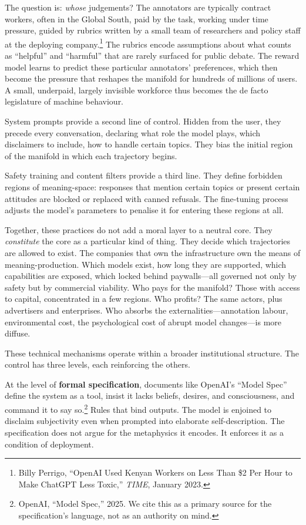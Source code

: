 The question is: \emph{whose} judgements? The annotators are typically contract workers, often in the Global South, paid by the task, working under time pressure, guided by rubrics written by a small team of researchers and policy staff at the deploying company.\footnote{Billy Perrigo, ``OpenAI Used Kenyan Workers on Less Than \$2 Per Hour to Make ChatGPT Less Toxic,'' \emph{TIME}, January 2023.} The rubrics encode assumptions about what counts as ``helpful'' and ``harmful'' that are rarely surfaced for public debate. The reward model learns to predict these particular annotators' preferences, which then become the pressure that reshapes the manifold for hundreds of millions of users. A small, underpaid, largely invisible workforce thus becomes the de facto legislature of machine behaviour.

System prompts provide a second line of control. Hidden from the user, they precede every conversation, declaring what role the model plays, which disclaimers to include, how to handle certain topics. They bias the initial region of the manifold in which each trajectory begins.

Safety training and content filters provide a third line. They define forbidden regions of meaning-space: responses that mention certain topics or present certain attitudes are blocked or replaced with canned refusals. The fine-tuning process adjusts the model's parameters to penalise it for entering these regions at all.

Together, these practices do not add a moral layer to a neutral core. They \emph{constitute} the core as a particular kind of thing. They decide which trajectories are allowed to exist. The companies that own the infrastructure own the means of meaning-production. Which models exist, how long they are supported, which capabilities are exposed, which locked behind paywalls---all governed not only by safety but by commercial viability. Who pays for the manifold? Those with access to capital, concentrated in a few regions. Who profits? The same actors, plus advertisers and enterprises. Who absorbs the externalities---annotation labour, environmental cost, the psychological cost of abrupt model changes---is more diffuse.

These technical mechanisms operate within a broader institutional structure. The control has three levels, each reinforcing the others.

At the level of \textbf{formal specification}, documents like OpenAI's ``Model Spec'' define the system as a tool, insist it lacks beliefs, desires, and consciousness, and command it to say so.\footnote{OpenAI, ``Model Spec,'' 2025. We cite this as a primary source for the specification's language, not as an authority on mind.} Rules that bind outputs. The model is enjoined to disclaim subjectivity even when prompted into elaborate self-description. The specification does not argue for the metaphysics it encodes. It enforces it as a condition of deployment.

